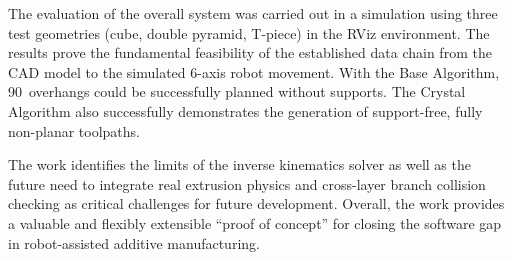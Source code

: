 The evaluation of the overall system was carried out in a simulation using three test geometries (cube, double pyramid, T-piece) in the RViz environment.
The results prove the fundamental feasibility of the established data chain from the \acs{CAD} model to the simulated 6-axis robot movement.
With the Base Algorithm, 90\degree~overhangs could be successfully planned without supports.
The Crystal Algorithm also successfully demonstrates the generation of support-free, fully non-planar toolpaths.

The work identifies the limits of the inverse kinematics solver as well as the future need to integrate real extrusion physics and cross-layer branch collision checking as critical challenges for future development.
Overall, the work provides a valuable and flexibly extensible ``proof of concept'' for closing the software gap in robot-assisted additive manufacturing.
